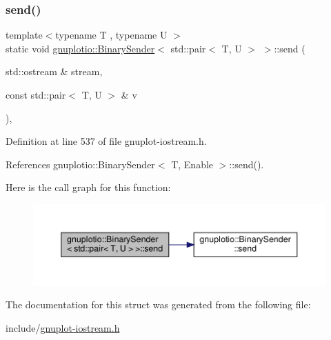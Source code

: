 \subsubsection{\texorpdfstring{send()}{send()}}
{\footnotesize\ttfamily template$<$typename T , typename U $>$ \\
static void \hyperlink{structgnuplotio_1_1_binary_sender}{gnuplotio\+::\+Binary\+Sender}$<$ std\+::pair$<$ T, U $>$ $>$\+::send (\begin{DoxyParamCaption}\item[{std\+::ostream \&}]{stream,  }\item[{const std\+::pair$<$ T, U $>$ \&}]{v }\end{DoxyParamCaption})\hspace{0.3cm}{\ttfamily [inline]}, {\ttfamily [static]}}



Definition at line 537 of file gnuplot-\/iostream.\+h.



References gnuplotio\+::\+Binary\+Sender$<$ T, Enable $>$\+::send().

Here is the call graph for this function\+:\nopagebreak
\begin{figure}[H]
\begin{center}
\leavevmode
\includegraphics[width=350pt]{structgnuplotio_1_1_binary_sender_3_01std_1_1pair_3_01_t_00_01_u_01_4_01_4_a9d949c8e7b1dea493288b0a2dd95cbff_cgraph}
\end{center}
\end{figure}


The documentation for this struct was generated from the following file\+:\begin{DoxyCompactItemize}
\item 
include/\hyperlink{gnuplot-iostream_8h}{gnuplot-\/iostream.\+h}\end{DoxyCompactItemize}
